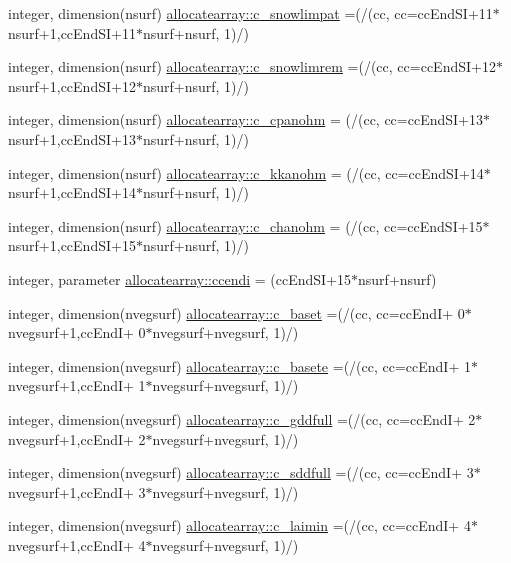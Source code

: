 \begin{DoxyCompactItemize}
\item 
integer, dimension(nsurf) \hyperlink{namespaceallocatearray_a530b446aad98c04f5e7999ac4a5e6c9e}{allocatearray\+::c\+\_\+snowlimpat} =(/(cc, cc=cc\+End\+SI+11$\ast$nsurf+1,cc\+End\+SI+11$\ast$nsurf+nsurf, 1)/)
\item 
integer, dimension(nsurf) \hyperlink{namespaceallocatearray_aabfc6114ca3ad63415f899086be4f8ed}{allocatearray\+::c\+\_\+snowlimrem} =(/(cc, cc=cc\+End\+SI+12$\ast$nsurf+1,cc\+End\+SI+12$\ast$nsurf+nsurf, 1)/)
\item 
integer, dimension(nsurf) \hyperlink{namespaceallocatearray_a1327a23cdaae83ba7b37451d97284802}{allocatearray\+::c\+\_\+cpanohm} = (/(cc, cc=cc\+End\+SI+13$\ast$nsurf+1,cc\+End\+SI+13$\ast$nsurf+nsurf, 1)/)
\item 
integer, dimension(nsurf) \hyperlink{namespaceallocatearray_a0d728974695e05ee49baca0830e3f97d}{allocatearray\+::c\+\_\+kkanohm} = (/(cc, cc=cc\+End\+SI+14$\ast$nsurf+1,cc\+End\+SI+14$\ast$nsurf+nsurf, 1)/)
\item 
integer, dimension(nsurf) \hyperlink{namespaceallocatearray_a4ceb63320f23499a78df99d33a600cda}{allocatearray\+::c\+\_\+chanohm} = (/(cc, cc=cc\+End\+SI+15$\ast$nsurf+1,cc\+End\+SI+15$\ast$nsurf+nsurf, 1)/)
\item 
integer, parameter \hyperlink{namespaceallocatearray_af9ae03fc712bb619c65cb29844048e33}{allocatearray\+::ccendi} = (cc\+End\+SI+15$\ast$nsurf+nsurf)
\item 
integer, dimension(nvegsurf) \hyperlink{namespaceallocatearray_aae3a05a05214369ae0e7293efe27aded}{allocatearray\+::c\+\_\+baset} =(/(cc, cc=cc\+EndI+ 0$\ast$nvegsurf+1,cc\+EndI+ 0$\ast$nvegsurf+nvegsurf, 1)/)
\item 
integer, dimension(nvegsurf) \hyperlink{namespaceallocatearray_afd2a7a91940e16c0cb922eb9bfd9469e}{allocatearray\+::c\+\_\+basete} =(/(cc, cc=cc\+EndI+ 1$\ast$nvegsurf+1,cc\+EndI+ 1$\ast$nvegsurf+nvegsurf, 1)/)
\item 
integer, dimension(nvegsurf) \hyperlink{namespaceallocatearray_a0539fd468872f90f631dfbdb953a6806}{allocatearray\+::c\+\_\+gddfull} =(/(cc, cc=cc\+EndI+ 2$\ast$nvegsurf+1,cc\+EndI+ 2$\ast$nvegsurf+nvegsurf, 1)/)
\item 
integer, dimension(nvegsurf) \hyperlink{namespaceallocatearray_a207aa7370094486a8891ef23c877fa52}{allocatearray\+::c\+\_\+sddfull} =(/(cc, cc=cc\+EndI+ 3$\ast$nvegsurf+1,cc\+EndI+ 3$\ast$nvegsurf+nvegsurf, 1)/)
\item 
integer, dimension(nvegsurf) \hyperlink{namespaceallocatearray_a76848439645a7bb8eb68647882c6b41a}{allocatearray\+::c\+\_\+laimin} =(/(cc, cc=cc\+EndI+ 4$\ast$nvegsurf+1,cc\+EndI+ 4$\ast$nvegsurf+nvegsurf, 1)/)

\end{DoxyCompactItemize}
